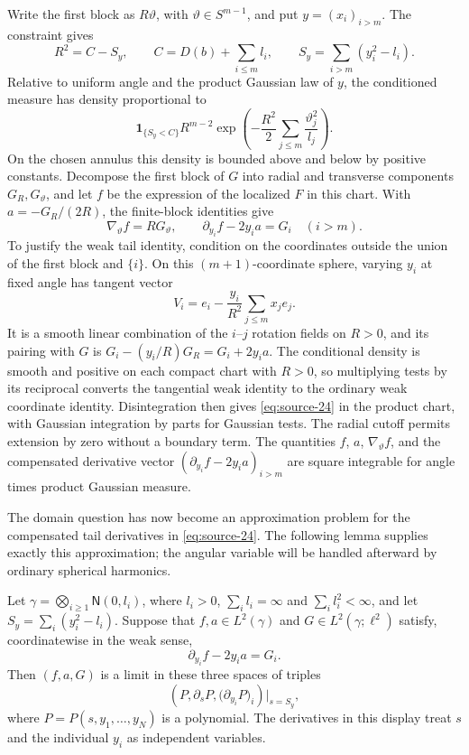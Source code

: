 Write the first block as $R\vartheta$, with
$\vartheta\in S^{m-1}$, and put $y=(x_i)_{i>m}$. The constraint gives
\[
 R^2=C-S_y,
 \qquad C=D(b)+\sum_{i\le m}l_i,
 \qquad S_y=\sum_{i>m}(y_i^2-l_i).
\]
Relative to uniform angle and the product Gaussian law of $y$, the
conditioned measure has density proportional to
\[
 \mathbf1_{\{S_y<C\}}R^{m-2}
 \exp\left(-\frac{R^2}{2}
                   \sum_{j\le m}\frac{\vartheta_j^2}{l_j}\right).
\]
On the chosen annulus this density is bounded above and below by
positive constants. Decompose the first block of $G$ into radial and
transverse components $G_R,G_\vartheta$, and let $f$ be the expression
of the localized $F$ in this chart. With $a=-G_R/(2R)$, the finite-block
identities give
\begin{equation}
 \nabla_\vartheta f=R G_\vartheta,
 \qquad
 \partial_{y_i}f-2y_i a=G_i\quad(i>m).
 \label{eq:source-24}
\end{equation}
To justify the weak tail identity, condition on the coordinates outside
the union of the first block and $\{i\}$. On this $(m+1)$-coordinate
sphere, varying $y_i$ at fixed angle has tangent vector
\[
 V_i=e_i-\frac{y_i}{R^2}\sum_{j\le m}x_j e_j.
\]
It is a smooth linear combination of the $i$--$j$ rotation fields on
$R>0$, and its pairing with $G$ is
$G_i-(y_i/R)G_R=G_i+2y_i a$. The conditional density is smooth and positive on
each compact chart with $R>0$, so multiplying tests by its reciprocal
converts the tangential weak identity to the ordinary weak coordinate
identity. Disintegration then gives \eqref{eq:source-24} in the product
chart, with Gaussian integration by parts for Gaussian tests. The radial
cutoff permits extension by zero without a boundary term. The quantities
$f$, $a$, $\nabla_\vartheta f$, and the compensated derivative vector
$(\partial_{y_i}f-2y_i a)_{i>m}$ are square integrable for angle times
product Gaussian measure.

The domain question has now become an approximation problem for the
compensated tail derivatives in \eqref{eq:source-24}. The following
lemma supplies exactly this approximation; the angular variable will
be handled afterward by ordinary spherical harmonics.

\begin{lemma}
\label{lem:gradient-compensated}
Let $\gamma=\bigotimes_{i\ge1}\mathsf N(0,l_i)$, where $l_i>0$,
$\sum_i l_i=\infty$ and $\sum_i l_i^2<\infty$, and let
$S_y=\sum_i(y_i^2-l_i)$. Suppose that $f,a\in L^2(\gamma)$ and
$G\in L^2(\gamma;\ell^2)$ satisfy, coordinatewise in the weak sense,
\[
 \partial_{y_i}f-2y_i a=G_i.
\]
Then $(f,a,G)$ is a limit in these three spaces of triples
\[
 \left(P,\partial_s P,
       \bigl(\partial_{y_i}P\bigr)_i\right)\Big|_{s=S_y},
\]
where $P=P(s,y_1,\ldots,y_N)$ is a polynomial. The derivatives in this
display treat $s$ and the individual $y_i$ as independent variables.
\end{lemma}

